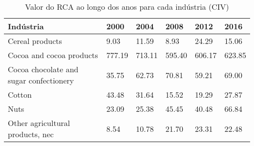 \begin{table}
\centering
\caption{Valor do RCA ao longo dos anos para cada indústria (CIV)}
\begin{tabular}{p{6cm}p{1.5cm}p{1.5cm}p{1.5cm}p{1.5cm}p{1.5cm}}
\toprule
                              Indústria &   2000 &   2004 &   2008 &   2012 &   2016 \\
\midrule
                        Cereal products &   9.03 &  11.59 &   8.93 &  24.29 &  15.06 \\
               Cocoa and cocoa products & 777.19 & 713.11 & 595.40 & 606.17 & 623.85 \\
Cocoa chocolate and sugar confectionery &  35.75 &  62.73 &  70.81 &  59.21 &  69.00 \\
                                 Cotton &  43.48 &  31.64 &  15.52 &  19.29 &  27.87 \\
                                   Nuts &  23.09 &  25.38 &  45.45 &  40.48 &  66.84 \\
       Other agricultural products, nec &   8.54 &  10.78 &  21.70 &  23.31 &  22.48 \\
\bottomrule
\end{tabular}
\end{table}
